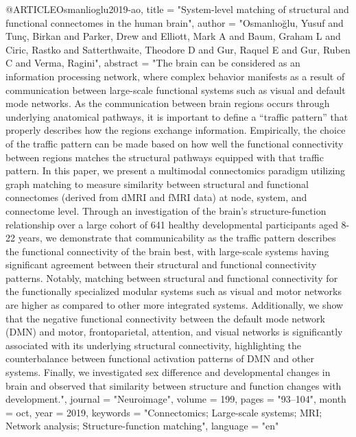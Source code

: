 @ARTICLE{Osmanlioglu2019-ao,
	title    = "System-level matching of structural and functional connectomes in
	the human brain",
	author   = "Osmanl{\i}o{\u g}lu, Yusuf and Tun{\c c}, Birkan and Parker, Drew
	and Elliott, Mark A and Baum, Graham L and Ciric, Rastko and
	Satterthwaite, Theodore D and Gur, Raquel E and Gur, Ruben C and
	Verma, Ragini",
	abstract = "The brain can be considered as an information processing network,
	where complex behavior manifests as a result of communication
	between large-scale functional systems such as visual and default
	mode networks. As the communication between brain regions occurs
	through underlying anatomical pathways, it is important to define
	a ``traffic pattern'' that properly describes how the regions
	exchange information. Empirically, the choice of the traffic
	pattern can be made based on how well the functional connectivity
	between regions matches the structural pathways equipped with
	that traffic pattern. In this paper, we present a multimodal
	connectomics paradigm utilizing graph matching to measure
	similarity between structural and functional connectomes (derived
	from dMRI and fMRI data) at node, system, and connectome level.
	Through an investigation of the brain's structure-function
	relationship over a large cohort of 641 healthy developmental
	participants aged 8-22 years, we demonstrate that communicability
	as the traffic pattern describes the functional connectivity of
	the brain best, with large-scale systems having significant
	agreement between their structural and functional connectivity
	patterns. Notably, matching between structural and functional
	connectivity for the functionally specialized modular systems
	such as visual and motor networks are higher as compared to other
	more integrated systems. Additionally, we show that the negative
	functional connectivity between the default mode network (DMN)
	and motor, frontoparietal, attention, and visual networks is
	significantly associated with its underlying structural
	connectivity, highlighting the counterbalance between functional
	activation patterns of DMN and other systems. Finally, we
	investigated sex difference and developmental changes in brain
	and observed that similarity between structure and function
	changes with development.",
	journal  = "Neuroimage",
	volume   =  199,
	pages    = "93--104",
	month    =  oct,
	year     =  2019,
	keywords = "Connectomics; Large-scale systems; MRI; Network analysis;
	Structure-function matching",
	language = "en"
}

